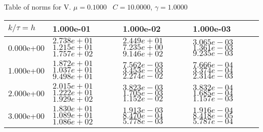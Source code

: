 \begin{center}
Table of norms for V. $\mu = 0.1000$ \, $C = 10.0000$, $\gamma = 1.0000$
  
\begin{tabular}{|p{1in}|p{1in}|p{1in}|p{1in}|} \hline
$k / \tau = h$ &1.000e-01 &1.000e-02 &1.000e-03 \\ \hline 
0.000e+00 & $2.738e+01$  $1.215e+01$  $1.757e+02$  & $2.449e+01$  $7.235e+00$  $9.146e+02$  & $3.065e-03$  $1.361e-03$  $9.235e-03$  \\ \hline 
1.000e+00 & $1.872e+01$  $1.037e+01$  $9.498e+01$  & $7.562e-03$  $3.453e-03$  $2.274e-02$  & $7.666e-04$  $3.374e-04$  $2.314e-03$  \\ \hline 
2.000e+00 & $2.015e+01$  $1.222e+01$  $1.929e+02$  & $3.823e-03$  $1.705e-03$  $1.152e-02$  & $3.832e-04$  $1.685e-04$  $1.157e-03$  \\ \hline 
3.000e+00 & $1.830e+01$  $1.089e+01$  $1.086e+02$  & $1.913e-03$  $8.470e-04$  $5.778e-03$  & $1.916e-04$  $8.418e-05$  $5.787e-04$  \\ \hline 

\end{tabular}\\[20pt]
\end{center}
